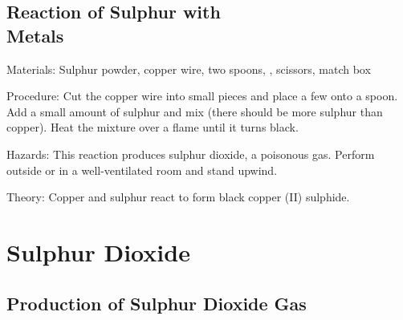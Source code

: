 \begin{multicols}{2}
\subsection{Reaction of Sulphur with \hfill \\ Metals} %


\begin{description*}
\item[Materials:]{Sulphur powder, copper wire, two spoons, , scissors, match box}
\item[Procedure:]{Cut the copper wire into small pieces and place a few onto a spoon. Add a small amount of sulphur and mix (there should be more sulphur than copper). Heat the mixture over a flame until it turns black.}
\item[Hazards:]{This reaction produces sulphur dioxide, a poisonous gas. Perform outside or in a well-ventilated room and stand upwind.}
\item[Theory:]{Copper and sulphur react to form black copper (II) sulphide.}
\end{description*}

\columnbreak


\section*{Sulphur Dioxide} 


\subsection{Production of Sulphur Dioxide Gas} %


\end{multicols}
